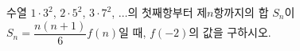 수열 $1\cdot3^2$, $2\cdot5^2$, $3\cdot7^2$, $\ldots$의 첫째항부터 제$n$항까지의 합 $S_n$이 $S_n=\dfrac{n(n+1)}{6}f(n)$일 때, $f(-2)$의 값을 구하시오.
